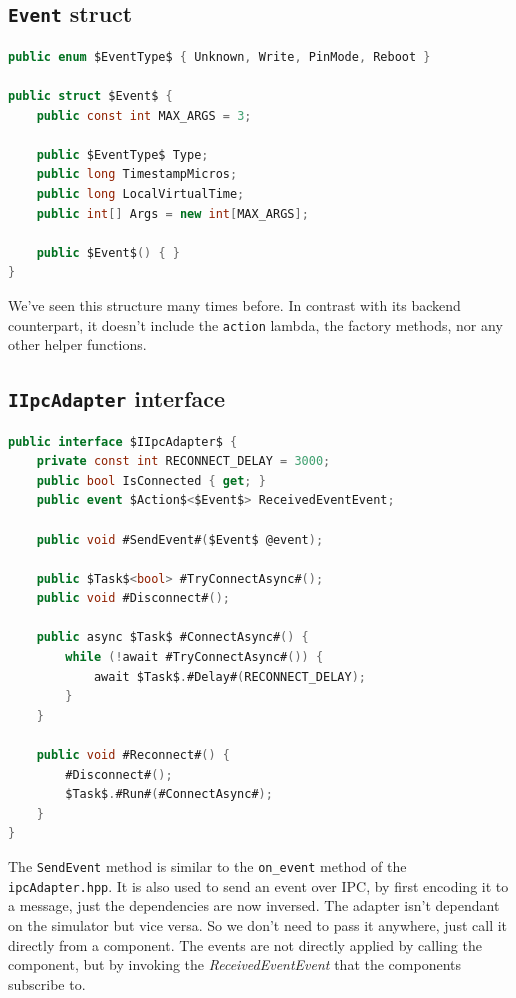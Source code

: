 \subsection{\texttt{Event} struct}

\begin{lstlisting}[language=csharp, caption={\texttt{Event} struct}]
public enum $EventType$ { Unknown, Write, PinMode, Reboot }

public struct $Event$ {
    public const int MAX_ARGS = 3;
    
    public $EventType$ Type;
    public long TimestampMicros;
    public long LocalVirtualTime;
    public int[] Args = new int[MAX_ARGS];
    
    public $Event$() { }
}
\end{lstlisting}

We've seen this structure many times before. In contrast with its backend counterpart, it doesn't include the \texttt{action} lambda, the factory methods, nor any other helper functions.

\subsection{\texttt{IIpcAdapter} interface}

\begin{lstlisting}[language=csharp, caption={\texttt{IIpcAdapter} interface}]
public interface $IIpcAdapter$ {
    private const int RECONNECT_DELAY = 3000;
    public bool IsConnected { get; }
    public event $Action$<$Event$> ReceivedEventEvent;
    
    public void #SendEvent#($Event$ @event);
    
    public $Task$<bool> #TryConnectAsync#();
    public void #Disconnect#();

    public async $Task$ #ConnectAsync#() { 
        while (!await #TryConnectAsync#()) {
            await $Task$.#Delay#(RECONNECT_DELAY);
        }
    }
    
    public void #Reconnect#() {
        #Disconnect#();
        $Task$.#Run#(#ConnectAsync#);
    }
}
\end{lstlisting}

The \texttt{SendEvent} method is similar to the \texttt{on\_event} method of the \texttt{ipcAdapter.hpp}. It is also used to send an event over IPC, by first encoding it to a message, just the dependencies are now inversed. The adapter isn't dependant on the simulator but vice versa. So we don't need to pass it anywhere, just call it directly from a component. The events are not directly applied by calling the component, but by invoking the \textit{ReceivedEventEvent} that the components subscribe to.

